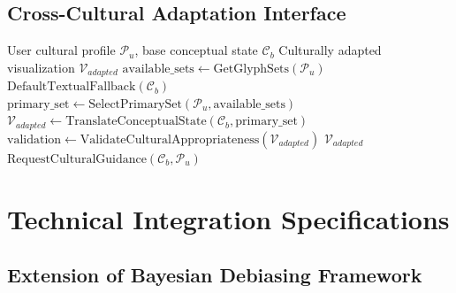 \documentclass[12pt]{article}
\begin{document}
\subsection{Cross-Cultural Adaptation Interface}

\begin{algorithm}
\caption{Cultural Context Adaptation}
\begin{algorithmic}[1]
\REQUIRE User cultural profile $\mathcal{P}_u$, base conceptual state $\mathcal{C}_b$
\ENSURE Culturally adapted visualization $\mathcal{V}_{adapted}$
\STATE $\text{available\_sets} \leftarrow \text{GetGlyphSets}(\mathcal{P}_u)$
    \STATE \RETURN $\text{DefaultTextualFallback}(\mathcal{C}_b)$
\ENDIF
\STATE $\text{primary\_set} \leftarrow \text{SelectPrimarySet}(\mathcal{P}_u, \text{available\_sets})$
\STATE $\mathcal{V}_{adapted} \leftarrow \text{TranslateConceptualState}(\mathcal{C}_b, \text{primary\_set})$
\STATE $\text{validation} \leftarrow \text{ValidateCulturalAppropriateness}(\mathcal{V}_{adapted})$
    \STATE \RETURN $\mathcal{V}_{adapted}$
\ELSE
    \STATE \RETURN $\text{RequestCulturalGuidance}(\mathcal{C}_b, \mathcal{P}_u)$
\ENDIF
\end{algorithmic}
\end{algorithm}

\section{Technical Integration Specifications}

\subsection{Extension of Bayesian Debiasing Framework}
\end{document}
